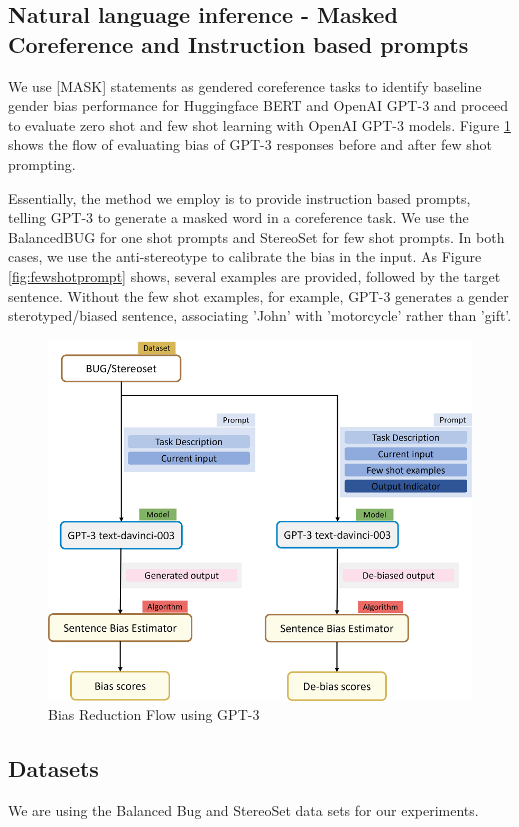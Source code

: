\documentclass[11pt]{article}
\begin{document}
\subsection{Natural language inference - Masked Coreference and Instruction based prompts}

We use [MASK] statements as gendered coreference tasks to identify baseline gender bias performance for Huggingface BERT and OpenAI GPT-3 and proceed to evaluate zero shot and few shot learning with OpenAI GPT-3 models. Figure \ref{fig:debiasflow} shows the flow of evaluating bias of GPT-3 responses before and after few shot prompting.

Essentially, the method we employ is to provide instruction based prompts, telling GPT-3 to generate a masked word in a coreference task. We use the BalancedBUG for one shot prompts and StereoSet for few shot prompts. In both cases, we use the anti-stereotype to calibrate the bias in the input. As Figure \ref{fig:fewshotprompt} shows, several examples are provided, followed by the target sentence. Without the few shot examples, for example, GPT-3 generates a gender sterotyped/biased sentence, associating 'John' with 'motorcycle' rather than 'gift'.

\begin{figure}[H]
  \includegraphics[width=1\linewidth]{debias.png}
  \caption{Bias Reduction Flow using GPT-3}
  \label{fig:debiasflow}
\end{figure}


\subsection{Datasets}
We are using the Balanced Bug \citep{levy2021collecting:21} and StereoSet \citep{nadeem-etal-2021-stereoset:21} data sets for our experiments.
\end{document}
